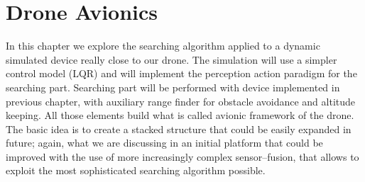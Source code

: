 \chapter{Drone Avionics}
\minitoc
\thispagestyle{plain}

\renewcommand{\arraystretch}{1.75}

In this chapter we explore the searching algorithm applied to a dynamic simulated device really close to our drone. The simulation will use a simpler control model (LQR) and will implement the perception action paradigm for the searching part. Searching part will be performed with device implemented in previous chapter, with auxiliary range finder for obstacle avoidance and altitude keeping. All those elements build what is called avionic framework of the drone. The basic idea is to create a stacked structure that could be easily expanded in future; again, what we are discussing in an initial platform that could be improved with the use of more increasingly complex sensor--fusion, that allows to exploit the most sophisticated searching algorithm possible. 







